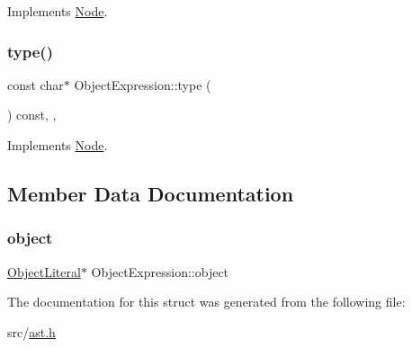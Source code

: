 Implements \hyperlink{struct_node_a10bd7af968140bbf5fa461298a969c71}{Node}.

\mbox{\label{struct_object_expression_ad232045e9914b06cfe8d7028ede2c365}} 
\subsubsection{\texorpdfstring{type()}{type()}}
{\footnotesize\ttfamily const char$\ast$ Object\+Expression\+::type (\begin{DoxyParamCaption}{ }\end{DoxyParamCaption}) const\hspace{0.3cm}{\ttfamily [inline]}, {\ttfamily [override]}, {\ttfamily [virtual]}}



Implements \hyperlink{struct_node_a82f29420d0a38efcc370352528e94e9b}{Node}.



\subsection{Member Data Documentation}
\mbox{\label{struct_object_expression_abd6be2f4cbb70b2ca388d57270bbf17c}} 
\subsubsection{\texorpdfstring{object}{object}}
{\footnotesize\ttfamily \hyperlink{struct_object_literal}{Object\+Literal}$\ast$ Object\+Expression\+::object}



The documentation for this struct was generated from the following file\+:\begin{DoxyCompactItemize}
\item 
src/\hyperlink{ast_8h}{ast.\+h}\end{DoxyCompactItemize}
